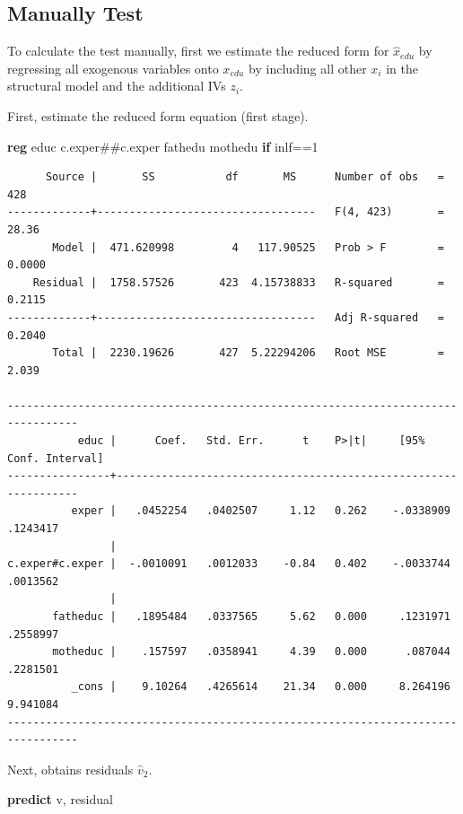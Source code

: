 \documentclass[
]{book}
\newenvironment{Shaded}{\begin{snugshade}}{\end{snugshade}}
\newcommand{\KeywordTok}[1]{\textcolor[rgb]{0.13,0.29,0.53}{\textbf{#1}}}
\newcommand{\NormalTok}[1]{#1}
\begin{document}
\subsection{Manually Test}\label{manually-test}

To calculate the test manually, first we estimate the reduced form for \(\hat{x}_{edu}\) by regressing all exogenous variables onto \(x_{edu}\) by including all other \(x_{i}\) in the structural model and the additional IVs \(z_i\).

First, estimate the reduced form equation (first stage).

\begin{Shaded}
\begin{Highlighting}[]
\KeywordTok{reg}\NormalTok{ educ c.exper\#\#c.exper fathedu mothedu }\KeywordTok{if}\NormalTok{ inlf==1}
\end{Highlighting}
\end{Shaded}

\begin{verbatim}
      Source |       SS           df       MS      Number of obs   =       428
-------------+----------------------------------   F(4, 423)       =     28.36
       Model |  471.620998         4   117.90525   Prob > F        =    0.0000
    Residual |  1758.57526       423  4.15738833   R-squared       =    0.2115
-------------+----------------------------------   Adj R-squared   =    0.2040
       Total |  2230.19626       427  5.22294206   Root MSE        =     2.039

---------------------------------------------------------------------------------
           educ |      Coef.   Std. Err.      t    P>|t|     [95% Conf. Interval]
----------------+----------------------------------------------------------------
          exper |   .0452254   .0402507     1.12   0.262    -.0338909    .1243417
                |
c.exper#c.exper |  -.0010091   .0012033    -0.84   0.402    -.0033744    .0013562
                |
       fatheduc |   .1895484   .0337565     5.62   0.000     .1231971    .2558997
       motheduc |    .157597   .0358941     4.39   0.000      .087044    .2281501
          _cons |    9.10264   .4265614    21.34   0.000     8.264196    9.941084
---------------------------------------------------------------------------------
\end{verbatim}

Next, obtains residuals \(\hat{v}_2\).

\begin{Shaded}
\begin{Highlighting}[]
\KeywordTok{predict}\NormalTok{ v, residual}
\end{Highlighting}
\end{Shaded}
\end{document}

